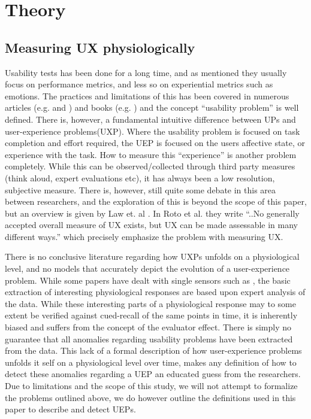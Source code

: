 \section{Theory}
\subsection{Measuring UX physiologically}
Usability tests has been done for a long time, and as mentioned they usually focus on performance metrics, and less so
on experiential metrics such as emotions. 
The practices and limitations of this has been covered in numerous articles (e.g. \cite{usability_eval} and \cite{eval_effect}) and books (e.g. \cite{guide_to_upeval}) and the concept ``usability problem'' is well defined.
There is, however, a fundamental intuitive difference between UPs and user-experience problems(UXP). 
Where the usability problem is focused on task completion and effort required, the UEP is focused on the users affective state, or experience with the task.
How to measure this ``experience'' is another problem completely.
While this can be observed/collected through third party measures (think aloud, expert evaluations etc), it has always been a low resolution, subjective measure. 
There is, however, still quite some debate in this area between researchers, and the exploration of this is beyond the scope of this paper, but an overview is given by Law et. al \cite{attitudes_ux_measure}. 
In Roto et al. \cite{what_is_ux} they write ``..No generally accepted overall measure of UX exists, but UX can be made assessable in many different ways.'' which precisely emphasize the problem with measuring UX. 

There is no conclusive literature regarding how UXPs unfolds on a physiological level, and no models that accurately
depict the evolution of a user-experience problem. 
While some papers have dealt with single sensors such as \cite{mind_the_gap} \cite{LH-paper}, the basic extraction of interesting physiological responses are based upon expert analysis of the data.
While these interesting parts of a physiological response may to some extent be verified against cued-recall of the same points in time, it is inherently biased and suffers from the concept of the evaluator effect. 
There is simply no guarantee that all anomalies regarding usability problems have been extracted from the data.
This lack of a formal description of how user-experience problems unfolds it self on a physiological level over time, makes any definition of how to detect these anomalies regarding a UEP an educated guess from the researchers.
Due to limitations and the scope of this study, we will not attempt to formalize the problems outlined above, we do however outline the definitions used in this paper to describe and detect UEPs.

